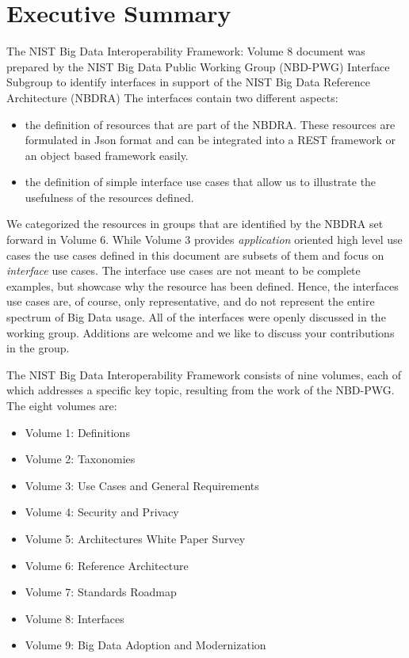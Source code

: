 \section*{Executive Summary}

The NIST Big Data Interoperability Framework: Volume 8 document
\cite{nist-vol-6} was prepared by the NIST Big Data Public Working
Group (NBD-PWG) Interface Subgroup to identify interfaces in support
of the NIST Big Data Reference Architecture (NBDRA) The interfaces
contain two different aspects:

\begin{itemize}

\item the definition of resources that are part of the NBDRA. These
  resources are formulated in Json format and can be integrated into a
  REST framework or an object based framework easily.

\item the definition of simple interface use cases that allow us to
  illustrate the usefulness of the resources defined.

\end{itemize} 

We categorized the resources in groups that are identified by the
NBDRA set forward in Volume 6. While Volume 3 provides {\it
  application} oriented high level use cases the use cases defined in
this document are subsets of them and focus on {\it interface} use
cases. The interface use cases are not meant to be complete examples,
but showcase why the resource has been defined. Hence, the interfaces
use cases are, of course, only representative, and do not represent
the entire spectrum of Big Data usage. All of the interfaces were
openly discussed in the working group. Additions are welcome and we
like to discuss your contributions in the group.

The NIST Big Data Interoperability Framework consists of nine
volumes, each of which addresses a specific key topic, resulting from
the work of the NBD-PWG. The eight volumes are:

\begin{itemize}
\item Volume 1: Definitions
\item Volume 2: Taxonomies
\item Volume 3: Use Cases and General Requirements
\item Volume 4: Security and Privacy
\item Volume 5: Architectures White Paper Survey
\item Volume 6: Reference Architecture
\item Volume 7: Standards Roadmap
\item Volume 8: Interfaces
\item Volume 9: Big Data Adoption and Modernization
\end{itemize}

